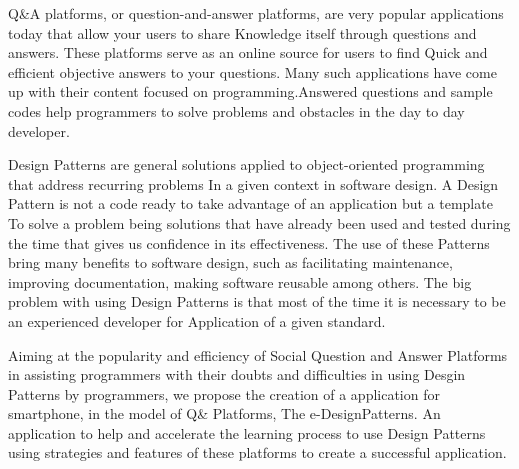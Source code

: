 Q\&A platforms, or question-and-answer platforms, are very popular applications today that allow your users to share
 Knowledge itself through questions and answers. These platforms serve as an online source for users to find
 Quick and efficient objective answers to your questions. Many such applications have come up with their content focused
 on programming.Answered questions and sample codes help programmers to solve problems and obstacles in the day to day developer.

Design Patterns are general solutions applied to object-oriented programming that address recurring problems
 In a given context in software design. A Design Pattern is not a code ready to take advantage of an application but a template
 To solve a problem being solutions that have already been used and tested during the time that gives us confidence in its effectiveness.
 The use of these Patterns bring many benefits to software design, such as facilitating maintenance, improving documentation, making
 software reusable among others. The big problem with using Design Patterns is that most of the time it is necessary to be an experienced developer for Application of a given standard.

Aiming at the popularity and efficiency of Social Question and Answer Platforms in assisting programmers with their doubts and difficulties in using
 Desgin Patterns by programmers, we propose the creation of a application for smartphone, in the model of Q\&  Platforms, 
The e-DesignPatterns. An application to help and accelerate the learning process to use Design Patterns using strategies and features of these platforms to create a successful application.